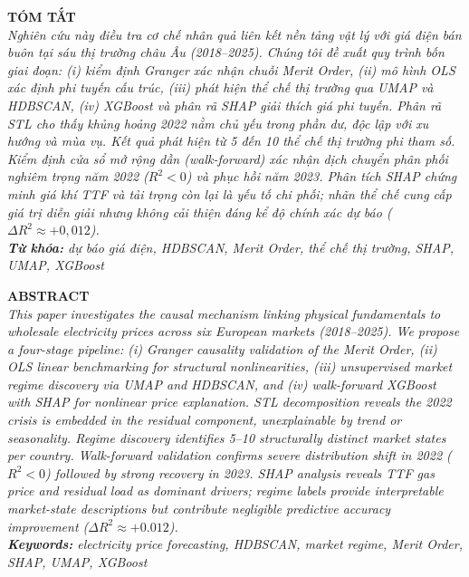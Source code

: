 \documentclass[10pt, a4paper, twocolumn]{article}
\begin{document}
\newpage

\noindent\textbf{TÓM TẮT}\\
\textit{\small
  Nghiên cứu này điều tra cơ chế nhân quả liên kết nền tảng vật lý với giá điện bán buôn tại sáu thị trường châu Âu (2018--2025). Chúng tôi đề xuất quy trình bốn giai đoạn: (i) kiểm định Granger xác nhận chuỗi Merit Order, (ii) mô hình OLS xác định phi tuyến cấu trúc, (iii) phát hiện thể chế thị trường qua UMAP và HDBSCAN, (iv) XGBoost và phân rã SHAP giải thích giá phi tuyến. Phân rã STL cho thấy khủng hoảng 2022 nằm chủ yếu trong phần dư, độc lập với xu hướng và mùa vụ. Kết quả phát hiện từ 5 đến 10 thể chế thị trường phi tham số. Kiểm định cửa sổ mở rộng dần (walk-forward) xác nhận dịch chuyển phân phối nghiêm trọng năm 2022 ($R^2 < 0$) và phục hồi năm 2023. Phân tích SHAP chứng minh giá khí TTF và tải trọng còn lại là yếu tố chi phối; nhãn thể chế cung cấp giá trị diễn giải nhưng không cải thiện đáng kể độ chính xác dự báo ($\Delta R^2 \approx +0{,}012$).
}\\[0.4em]
\noindent\textit{\small\textbf{Từ khóa:} dự báo giá điện, HDBSCAN, Merit Order, thể chế thị trường, SHAP, UMAP, XGBoost}
\vspace{1.0em}

\noindent\textbf{ABSTRACT}\\
\textit{\small
  This paper investigates the causal mechanism linking physical fundamentals to wholesale electricity prices across six European markets (2018--2025). We propose a four-stage pipeline: (i) Granger causality validation of the Merit Order, (ii) OLS linear benchmarking for structural nonlinearities, (iii) unsupervised market regime discovery via UMAP and HDBSCAN, and (iv) walk-forward XGBoost with SHAP for nonlinear price explanation. STL decomposition reveals the 2022 crisis is embedded in the residual component, unexplainable by trend or seasonality. Regime discovery identifies 5--10 structurally distinct market states per country. Walk-forward validation confirms severe distribution shift in 2022 ($R^2 < 0$) followed by strong recovery in 2023. SHAP analysis reveals TTF gas price and residual load as dominant drivers; regime labels provide interpretable market-state descriptions but contribute negligible predictive accuracy improvement ($\Delta R^2 \approx +0.012$).
}\\[0.4em]
\noindent\textit{\small\textbf{Keywords:} electricity price forecasting, HDBSCAN, market regime, Merit Order, SHAP, UMAP, XGBoost}
\end{document}
